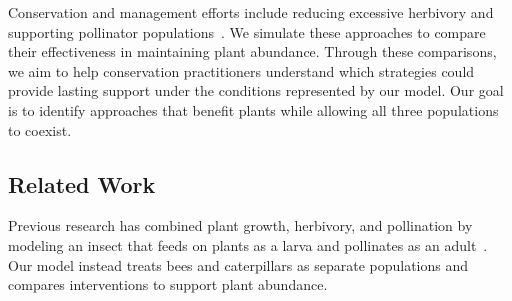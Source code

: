 \documentclass[11pt]{amsart}
\begin{document}
Conservation and management efforts include reducing excessive herbivory and supporting pollinator populations~\cite{fwsIntegratedPestManagement,epaPollinatorProtection}. We simulate these approaches to compare their effectiveness in maintaining plant abundance. Through these comparisons, we aim to help conservation practitioners understand which strategies could provide lasting support under the conditions represented by our model. Our goal is to identify approaches that benefit plants while allowing all three populations to coexist.

\subsection{Related Work}

Previous research has combined plant growth, herbivory, and pollination by modeling an insect that feeds on plants as a larva and pollinates as an adult~\cite{revilla2015}. Our model instead treats bees and caterpillars as separate populations and compares interventions to support plant abundance.

\end{document}
